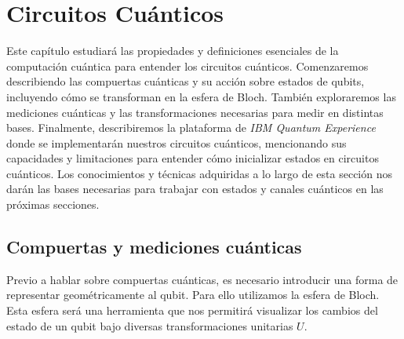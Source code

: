\documentclass[letterpaper,12pt]{thesisECFM}
\theoremstyle{plain}
\theoremstyle{definition}
\theoremstyle{definition}
\theoremstyle{remark}
\newcommand{\1}{\mathbb{1}}
\begin{document}
\section{Circuitos Cuánticos} %
\label{introduccion} 
Este capítulo estudiará las propiedades y definiciones esenciales de la
computación cuántica para entender los circuitos cuánticos. Comenzaremos
describiendo las compuertas cuánticas y su acción sobre estados de qubits,
incluyendo cómo se transforman en la esfera de Bloch. También exploraremos las
mediciones cuánticas y las transformaciones necesarias para medir en distintas
bases. Finalmente, describiremos la plataforma de \textit{IBM Quantum
Experience} donde se implementarán nuestros circuitos cuánticos, mencionando
sus capacidades y limitaciones para entender cómo inicializar estados en
circuitos cuánticos. Los conocimientos y técnicas adquiridas a lo largo de esta
sección nos darán las bases necesarias para
trabajar con estados y canales cuánticos en las próximas secciones.
\subsection{Compuertas y mediciones cuánticas} %

Previo a hablar sobre compuertas cuánticas, es necesario introducir una forma
de representar geométricamente al qubit. Para ello utilizamos la esfera de
Bloch. Esta esfera será una herramienta que nos permitirá visualizar los
cambios del estado de un qubit bajo diversas transformaciones unitarias $U$.
\end{document}

